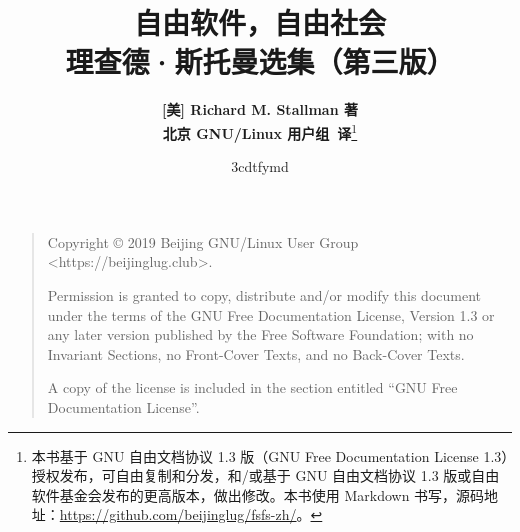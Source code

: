 \documentclass[a5paper, UTF8, openright]{book}
\title{\huge{\textbf{自由软件，自由社会}}\\
\large{理查德·斯托曼选集（第三版）}}
\title{{\savedtitle}}
\author{\textbf{[美] Richard M. Stallman 著}\\
       \textbf{北京 GNU/Linux 用户组\ 译}\thanks{本书基于 GNU 自由文档协议 1.3 版（GNU Free Documentation License 1.3）授权发布，可自由复制和分发，和/或基于 GNU 自由文档协议 1.3 版或自由软件基金会发布的更高版本，做出修改。本书使用 Markdown 书写，源码地址：\url{https://github.com/beijinglug/fsfs-zh/}。}}
\date{\w3cdtfymd}
\renewcommand{\headrulewidth}{0pt}
\newcounter{img}[chapter]
\newcounter{tab}[chapter]
\newcommand{\prechap}{第}
\newcommand{\postchap}{部分}
\renewcommand{\appendixname}{附录 }
\begin{document}
%
\maketitle

\begin{quote}
\noindent
Copyright \copyright{} 2019 Beijing GNU/Linux User Group <https://beijinglug.club>.

\noindent
Permission is granted to copy, distribute and/or modify this document under the terms of the GNU Free Documentation License, Version 1.3 or any later version published by the Free Software Foundation; with no Invariant Sections, no Front-Cover Texts, and no Back-Cover Texts.

\noindent
A copy of the license is included in the section entitled ``GNU Free Documentation License''.
\end{quote}

\thispagestyle{empty}
\setcounter{tocdepth}{1}

\frontmatter

\tableofcontents\newpage\thispagestyle{empty}


\fancyhf{}
\fancyhead[LE]{\color{colorheader}\quad\small\textbf\thepage\quad\quad\small\leftmark}
\fancyhead[RO]{\color{colorheader}\small\rightmark\quad\quad\small\textbf\thepage\quad}
\fancyfoot[LE,RO]{\small\textbf\thepage} %

\renewcommand{\headrulewidth}{0.4pt}  %
\pagestyle{fancy}

\mainmatter

\appendices
\renewcommand{\prechap}{\appendixname}
\renewcommand{\postchap}{}

\end{document}
